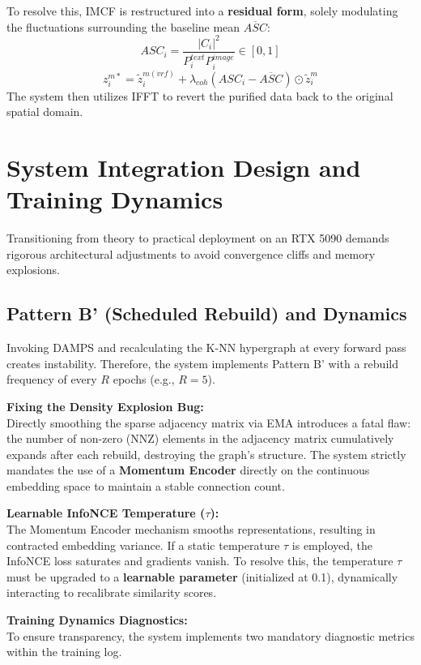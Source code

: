 \documentclass[12pt, a4paper]{article}
\begin{document}
To resolve this, IMCF is restructured into a \textbf{residual form}, solely modulating the fluctuations surrounding the baseline mean $\overline{ASC}$:
\begin{equation}
ASC_i = \frac{|C_i|^2}{P_i^{text}P_i^{image}} \in [0, 1]
\end{equation}
\begin{equation}
z_i^{m*} = \tilde{z}_i^{m(vrf)} + \lambda_{coh}(ASC_i - \overline{ASC}) \odot \tilde{z}_i^m
\end{equation}
The system then utilizes IFFT to revert the purified data back to the original spatial domain.

\section{System Integration Design and Training Dynamics}
Transitioning from theory to practical deployment on an RTX 5090 demands rigorous architectural adjustments to avoid convergence cliffs and memory explosions.

\subsection{Pattern B' (Scheduled Rebuild) and Dynamics}
Invoking DAMPS and recalculating the K-NN hypergraph at every forward pass creates instability. Therefore, the system implements Pattern B' with a rebuild frequency of every $R$ epochs (e.g., $R=5$).

\textbf{Fixing the Density Explosion Bug:}\\
Directly smoothing the sparse adjacency matrix via EMA introduces a fatal flaw: the number of non-zero (NNZ) elements in the adjacency matrix cumulatively expands after each rebuild, destroying the graph's structure. The system strictly mandates the use of a \textbf{Momentum Encoder} directly on the continuous embedding space to maintain a stable connection count.

\textbf{Learnable InfoNCE Temperature ($\tau$):}\\
The Momentum Encoder mechanism smooths representations, resulting in contracted embedding variance. If a static temperature $\tau$ is employed, the InfoNCE loss saturates and gradients vanish. To resolve this, the temperature $\tau$ must be upgraded to a \textbf{learnable parameter} (initialized at 0.1), dynamically interacting to recalibrate similarity scores.

\textbf{Training Dynamics Diagnostics:}\\
To ensure transparency, the system implements two mandatory diagnostic metrics within the training log. 
\end{document}
